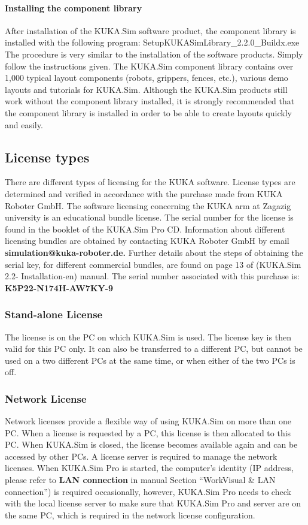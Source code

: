  	\paragraph{Installing the component library }
 	After installation of the KUKA.Sim software product, the component library is installed with the following program: SetupKUKASimLibrary\_2.2.0\_Buildx.exe The procedure is very similar to the installation of the software products. Simply follow the instructions given.
 	The KUKA.Sim component library contains over 1,000 typical layout components (robots, grippers, fences, etc.), various demo layouts and tutorials for KUKA.Sim. Although the KUKA.Sim products still work without the component library installed, it is strongly recommended that the component library is installed in order to be able to create layouts quickly and easily.
 	
 	\subsection{License types}
 	There are different types of licensing for the KUKA software. License types are determined and verified in accordance with the purchase made from KUKA Roboter GmbH. 
 	The software licensing concerning the KUKA arm at Zagazig university is an educational bundle license. The serial number for the license is found in the booklet of the KUKA.Sim Pro CD. Information about different licensing bundles are obtained by contacting KUKA Roboter GmbH by email
 	\textbf {simulation@kuka-roboter.de.}
 	Further details about the steps of obtaining the serial key, for different commercial bundles,  are found on page 13 of (KUKA.Sim 2.2- Installation-en) manual.
 	The serial number associated with this purchase is: \textbf {K5P22-N174H-AW7KY-9}
 	
 		\subsubsection{Stand-alone License}
 		The license is on the PC on which KUKA.Sim is used. The license key is then valid for this PC only. It can also be transferred to a different PC, but cannot be used on a two different PCs at the same time, or when either of the two PCs is off.
 		
 		\subsubsection{Network License}
 		Network licenses provide a flexible way of using KUKA.Sim on more than one PC. When a license is requested by a PC, this license is then allocated to this PC. When KUKA.Sim is closed, the license becomes available again and can be accessed by other PCs. 
 		A license server is required to manage the network licenses. When KUKA.Sim Pro is started, the computer’s identity (IP address, please refer to \textbf {LAN connection} in manual Section “WorkVisual \& LAN connection”) is required occasionally, however, KUKA.Sim Pro needs to check with the local license server to make sure that KUKA.Sim Pro and server are on the same PC, which is required in the network license configuration.
 	
